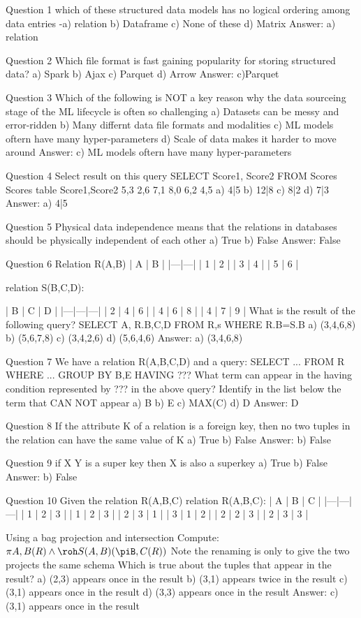 Question 1
which of these structured data models has no logical ordering among data entries
-a) relation
b) Dataframe
c) None of these
d) Matrix
Answer: a) relation

Question 2
Which file format is fast gaining popularity for storing structured data?
a) Spark
b) Ajax
c) Parquet
d) Arrow
Answer: c)Parquet

Question 3
Which of the following is NOT a key reason why the data sourceing stage of the ML lifecycle is often so challenging
a) Datasets can be messy and error-ridden
b) Many differnt data file formats and modalities
c) ML models oftern have many hyper-parameters
d) Scale of data makes it harder to move around
Answer: c) ML models oftern have many hyper-parameters

Question 4
Select result on this query
SELECT Score1, Score2
FROM Scores
Scores table
Score1,Score2
5,3
2,6
7,1
8,0
6,2
4,5
a) 4|5
b) 12|8
c) 8|2
d) 7|3
Answer: a) 4|5

Question 5
Physical data independence means that the relations in databases should be physically independent of each other
a) True
b) False
Answer: False


Question 6
Relation R(A,B)
    | A | B |
    |---|---|
    | 1 | 2 |
    | 3 | 4 |
    | 5 | 6 |

 relation S(B,C,D):

    | B | C | D |
    |---|---|---|
    | 2 | 4 | 6 |
    | 4 | 6 | 8 |
    | 4 | 7 | 9 |
What is the result of the following query?
SELECT A, R.B,C,D
FROM R,s
WHERE R.B=S.B
a) (3,4,6,8)
b) (5,6,7,8)
c) (3,4,2,6)
d) (5,6,4,6)
Answer: a) (3,4,6,8)

Question 7
We have a relation R(A,B,C,D)
and a query:
SELECT ...
FROM R 
WHERE ...
GROUP BY B,E
HAVING ???
What term can appear in the having condition represented by ??? in the above query? Identify in the list below the term that CAN NOT appear
a) B
b) E
c) MAX(C)
d) D
Answer: D

Question 8
If the attribute K of a relation is a foreign key, then no two tuples in the relation can have the same value of K
a) True
b) False
Answer: b) False


Question 9
if X \cup Y is a super key then X is also a superkey
a) True
b) False
Answer: b) False

Question 10
Given the relation R(A,B,C)
relation  R(A,B,C):
| A | B | C |
|---|---|---|
| 1 | 2 | 3 |
| 1 | 2 | 3 |
| 2 | 3 | 1 |
| 3 | 1 | 2 |
| 2 | 2 | 3 |
| 2 | 3 | 3 |

Using a bag projection and intersection Compute: $\pi A,B(R) \wedge \roh S(A,B)(\piB,C(R))$
Note the renaming is only to give the two projects the same schema
Which is true about the tuples that appear in the result?
a) (2,3) appears once in the result
b) (3,1) appears twice in the result
c) (3,1) appears once in the result
d) (3,3) appears once in the result
Answer: c) (3,1) appears once in the result

